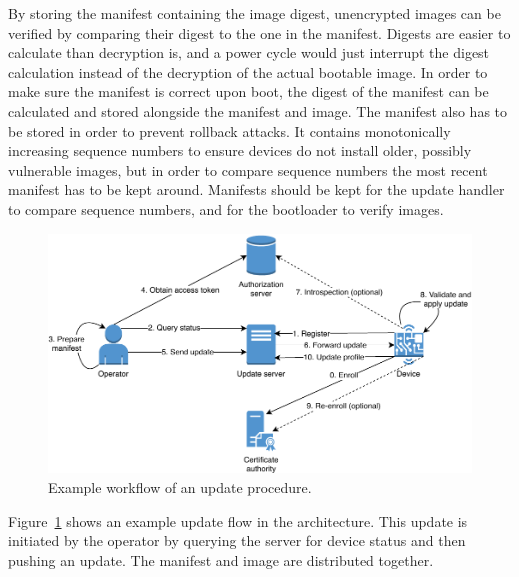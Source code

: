 \documentclass[0-thesis.tex]{subfiles}
\begin{document}
By storing the manifest containing the image digest, unencrypted images can be verified by
comparing their digest to the one in the manifest. Digests are easier to calculate than
decryption is, and a power cycle would just interrupt the digest calculation instead of
the decryption of the actual bootable image. In order to make sure the manifest is correct
upon boot, the digest of the manifest can be calculated and stored alongside the manifest
and image. The manifest also has to be stored in order to prevent rollback attacks. It
contains monotonically increasing sequence numbers to ensure devices do not install older,
possibly vulnerable images, but in order to compare sequence numbers the most recent
manifest has to be kept around. Manifests should be kept for the update handler to compare
sequence numbers, and for the bootloader to verify images.

\begin{figure}
    \caption{Example workflow of an update procedure.}
    \label{fig:communication-workflow}
    \includegraphics{images/update-flow.pdf}
\end{figure}

Figure~\ref{fig:communication-workflow} shows an example update flow in the architecture.
This update is initiated by the operator by querying the server for device status and then
pushing an update. The manifest and image are distributed together.
\end{document}
